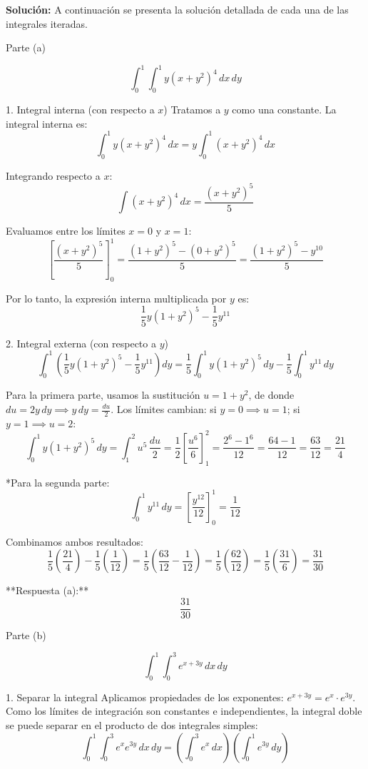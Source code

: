 \documentclass[12pt,a4paper]{report}
\newcommand{\solutionname}{Solución:}
\newenvironment{solution}{
 	\par\noindent\textbf{\color{structurecolor}\solutionname}
 	\color{black!90}}{\hfill\quad\par}
\begin{document}
\begin{solution}
A continuación se presenta la solución detallada de cada una de las integrales iteradas.



 Parte (a)

$$\int_{0}^{1} \int_{0}^{1} y(x + y^2)^4 \, dx \, dy$$

1. Integral interna (con respecto a $x$)
Tratamos a $y$ como una constante. La integral interna es:
$$\int_{0}^{1} y(x + y^2)^4 \, dx = y \int_{0}^{1} (x + y^2)^4 \, dx$$

Integrando respecto a $x$:
$$\int (x + y^2)^4 \, dx = \frac{(x + y^2)^5}{5}$$

Evaluamos entre los límites $x = 0$ y $x = 1$:
$$\left[ \frac{(x + y^2)^5}{5} \right]_{0}^{1} = \frac{(1 + y^2)^5 - (0 + y^2)^5}{5} = \frac{(1 + y^2)^5 - y^{10}}{5}$$

Por lo tanto, la expresión interna multiplicada por $y$ es:
$$\frac{1}{5} y (1 + y^2)^5 - \frac{1}{5} y^{11}$$

 2. Integral externa (con respecto a $y$)
$$\int_{0}^{1} \left( \frac{1}{5} y (1 + y^2)^5 - \frac{1}{5} y^{11} \right) dy = \frac{1}{5} \int_{0}^{1} y (1 + y^2)^5 \, dy - \frac{1}{5} \int_{0}^{1} y^{11} \, dy$$

 Para la primera parte, usamos la sustitución $u = 1 + y^2$, de donde $du = 2y \, dy \implies y \, dy = \frac{du}{2}$.  
  Los límites cambian: si $y = 0 \implies u = 1$; si $y = 1 \implies u = 2$:
  $$\int_{0}^{1} y(1 + y^2)^5 \, dy = \int_{1}^{2} u^5 \, \frac{du}{2} = \frac{1}{2} \left[ \frac{u^6}{6} \right]_{1}^{2} = \frac{2^6 - 1^6}{12} = \frac{64 - 1}{12} = \frac{63}{12} = \frac{21}{4}$$

*Para la segunda parte:
  $$\int_{0}^{1} y^{11} \, dy = \left[ \frac{y^{12}}{12} \right]_{0}^{1} = \frac{1}{12}$$

Combinamos ambos resultados:
$$\frac{1}{5} \left( \frac{21}{4} \right) - \frac{1}{5} \left( \frac{1}{12} \right) = \frac{1}{5} \left( \frac{63}{12} - \frac{1}{12} \right) = \frac{1}{5} \left( \frac{62}{12} \right) = \frac{1}{5} \left( \frac{31}{6} \right) = \frac{31}{30}$$

**Respuesta (a):**
$$\frac{31}{30}$$



 Parte (b)

$$\int_{0}^{1} \int_{0}^{3} e^{x+3y} \, dx \, dy$$

 1. Separar la integral
Aplicamos propiedades de los exponentes: $e^{x+3y} = e^x \cdot e^{3y}$.  
Como los límites de integración son constantes e independientes, la integral doble se puede separar en el producto de dos integrales simples:
$$\int_{0}^{1} \int_{0}^{3} e^x e^{3y} \, dx \, dy = \left( \int_{0}^{3} e^x \, dx \right) \left( \int_{0}^{1} e^{3y} \, dy \right)$$


\end{solution}
\end{document}
